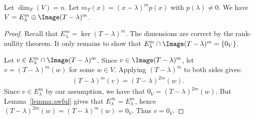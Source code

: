     \begin{lemma}\label{lemma:eigenspace-image}
        Let $\dim_F(V) = n$. Let $m_T(x) = (x-\lambda)^m p(x)$ with $p(\lambda) \neq 0$. We have $V = E_\lambda^m \oplus \Image(T-\lambda)^m$.
    \end{lemma}
        \begin{proof}
            Recall that $E_\lambda^m = \ker(T - \lambda)^m$. The dimensions are correct by the rank-nullity theorem. It only remains to show that $E_\lambda^m \cap \Image(T-\lambda)^m = \{0_V\}$. 

            Let $v \in E_\lambda^m \cap \Image(T-\lambda)^m$. Since $v \in \Image(T-\lambda)^m$, let $v = (T - \lambda)^m(w)$ for some $w \in V$. Applying $(T-\lambda)^m$ to both sides gives:
                \begin{equation*}
                \begin{split}
                    (T -\lambda)^m(v) = (T-\lambda)^{2m}(w).
                \end{split}
                \end{equation*}
            Since $v \in E_\lambda^m$ by our assumption, we have that $0_V = (T-\lambda)^{2m}(w)$. But Lemma~\ref{lemma:awful} gives that $E_\lambda^\infty = E_\lambda^m$, hence $(T-\lambda)^{2m}(w) = (T-\lambda)^{m}(w) = 0_V$. Thus $v = 0_V$.
        \end{proof}

